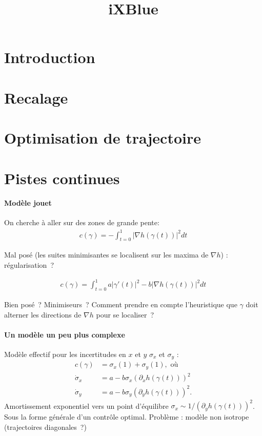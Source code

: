 \documentclass[11pt,oneside]{article}
\title{iXBlue}
\author{}
\date{}
\begin{document}
\maketitle
\setcounter{tocdepth}{1}
\tableofcontents

\section{Introduction}
\section{Recalage}
\section{Optimisation de trajectoire}
\section{Pistes continues}
\paragraph{Modèle jouet}
  On cherche à aller sur des zones de grande pente:
  \begin{align*}
    c(\gamma) = -\int_{t=0}^{1} |\nabla h(\gamma(t))|^{2}  dt
  \end{align*}

  Mal posé (les suites minimisantes se localisent sur les maxima de
  $\nabla h$) : régularisation~?
  
\begin{align*}
  c(\gamma) =  \int_{t=0}^{1} a |\gamma'(t)|^{2} - b |\nabla
  h(\gamma(t))|^{2} dt
\end{align*}

Bien posé~? Minimiseurs~? Comment prendre en compte l'heuristique que
$\gamma$ doit alterner les directions de $\nabla h$ pour se localiser~?


\paragraph{Un modèle un peu plus complexe}
Modèle effectif pour les incertitudes en $x$ et $y$ $\sigma_{x}$ et
$\sigma_{y}$ :
\begin{align*}
  c(\gamma) &= \sigma_{x}(1) + \sigma_{y}(1), \text{ où}\\
  \dot \sigma_{x} &= a - b \sigma_{x} (\partial_{x} h(\gamma(t)))^{2}\\
  \dot \sigma_{y} &= a - b \sigma_{y} (\partial_{y} h(\gamma(t)))^{2}.
\end{align*}
Amortissement exponentiel vers un point d'équilibre $\sigma_{x} \sim
1/(\partial_{y} h(\gamma(t)))^{2}$. Sous la forme générale d'un
contrôle optimal. Problème : modèle non isotrope (trajectoires
diagonales~?)
\end{document}
